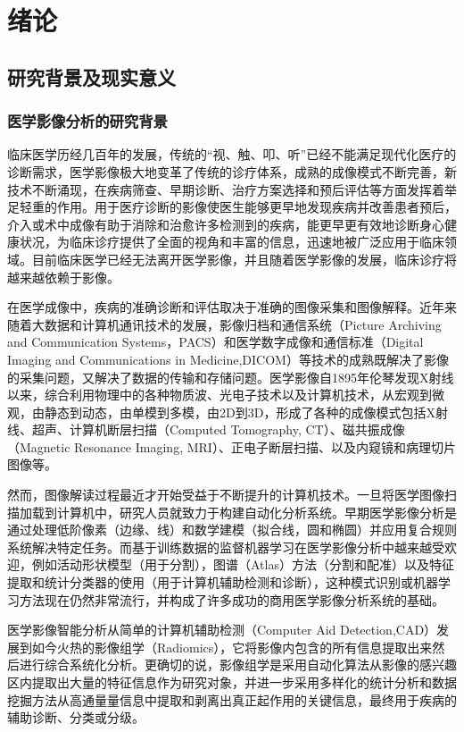 \chapter{绪论}
\label{chap:introduction}

\section{研究背景及现实意义}
\subsection{医学影像分析的研究背景}

临床医学历经几百年的发展，传统的“视、触、叩、听”已经不能满足现代化医疗的诊断需求，医学影像极大地变革了传统的诊疗体系，成熟的成像模式不断完善，新技术不断涌现，在疾病筛查、早期诊断、治疗方案选择和预后评估等方面发挥着举足轻重的作用。用于医疗诊断的影像使医生能够更早地发现疾病并改善患者预后，介入或术中成像有助于消除和治愈许多检测到的疾病，能更早更有效地诊断身心健康状况，为临床诊疗提供了全面的视角和丰富的信息，迅速地被广泛应用于临床领域。目前临床医学已经无法离开医学影像，并且随着医学影像的发展，临床诊疗将越来越依赖于影像。

在医学成像中，疾病的准确诊断和评估取决于准确的图像采集和图像解释。近年来随着大数据和计算机通讯技术的发展，影像归档和通信系统（Picture Archiving and Communication Systems，PACS）和医学数字成像和通信标准（Digital Imaging and Communications in Medicine,DICOM）等技术的成熟既解决了影像的采集问题，又解决了数据的传输和存储问题。医学影像自1895年伦琴发现X射线以来，综合利用物理中的各种物质波、光电子技术以及计算机技术，从宏观到微观，由静态到动态，由单模到多模，由2D到3D，形成了各种的成像模式包括X射线、超声、计算机断层扫描（Computed Tomography, CT）、磁共振成像（Magnetic Resonance Imaging, MRI）、正电子断层扫描、以及内窥镜和病理切片图像等。

然而，图像解读过程最近才开始受益于不断提升的计算机技术。一旦将医学图像扫描加载到计算机中，研究人员就致力于构建自动化分析系统。早期医学影像分析是通过处理低阶像素（边缘、线）和数学建模（拟合线，圆和椭圆）并应用复合规则系统解决特定任务。而基于训练数据的监督机器学习在医学影像分析中越来越受欢迎，例如活动形状模型（用于分割），图谱（Atlas）方法（分割和配准）以及特征提取和统计分类器的使用（用于计算机辅助检测和诊断），这种模式识别或机器学习方法现在仍然非常流行，并构成了许多成功的商用医学影像分析系统的基础。

医学影像智能分析从简单的计算机辅助检测（Computer Aid Detection,CAD）发展到如今火热的影像组学（Radiomics）\citep{Lambin2015}，它将影像内包含的所有信息提取出来然后进行综合系统化分析。更确切的说，影像组学是采用自动化算法从影像的感兴趣区内提取出大量的特征信息作为研究对象，并进一步采用多样化的统计分析和数据挖掘方法从高通量量信息中提取和剥离出真正起作用的关键信息，最终用于疾病的辅助诊断、分类或分级。

